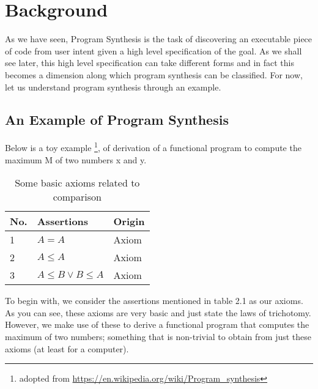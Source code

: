 \chapter{Background}

As we have seen, Program Synthesis is the task of discovering an executable piece of code from user intent given a high level specification of the goal. As we shall see later, this high level specification can take different forms and in fact this becomes a dimension \cite{gulwani2010dimensions} along which program synthesis can be classified. For now, let us understand program synthesis through an example.

\section{An Example of Program Synthesis}
Below is a toy example \footnote{adopted from \url{https://en.wikipedia.org/wiki/Program_synthesis}}, of derivation of a functional program to compute the maximum M of two numbers x and y. \\

\begin{table}[h!]
\centering
\label{max_synthesis_axioms}
\begin{tabular}{|l|l|l|}
\hline
No. & Assertions     			& Origin 		\\ \hline
1   & $A = A$        			& Axiom     	\\
2   & $A \leq A$				& Axiom     	\\
3   & $A \leq B \vee B \leq A$ 	& Axiom     	\\ \hline
\end{tabular}
\caption{Some basic axioms related to comparison}
\end{table}

\noindent
To begin with, we consider the assertions mentioned in table 2.1 as our axioms. As you can see, these axioms are very basic and just state the laws of trichotomy. However, we make use of these to derive a functional program that computes the maximum of two numbers; something that is non-trivial to obtain from just these axioms (at least for a computer). \\

